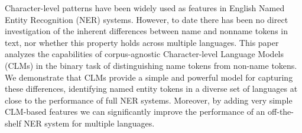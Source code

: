 Character-level patterns have been widely used as features in English Named Entity Recognition (NER) systems. However, to date there has been no direct investigation of the inherent differences between name and nonname tokens in text, nor whether this property holds across multiple languages. This paper analyzes the capabilities of corpus-agnostic Character-level Language Models (CLMs) in the binary task of distinguishing name tokens from non-name tokens. We demonstrate that CLMs provide a simple and powerful model for capturing these differences, identifying named entity tokens in a diverse set of languages at close to the performance of full NER systems. Moreover, by adding very simple CLM-based features we can significantly improve the performance of an off-the-shelf NER system for multiple languages.
